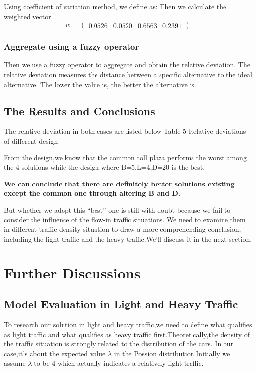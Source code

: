 Using coefficient of variation method, we define as:
Then we calculate the weighted vector
\begin{equation*}
w = 
\begin{pmatrix}
0.0526 & 0.0520 & 0.6563 &0.2391
\end{pmatrix}
\end{equation*}

\subsubsection{Aggregate using a fuzzy operator}
Then we use a fuzzy operator to aggregate and obtain the relative deviation.
The relative deviation measures the distance between a specific alternative to
the ideal alternative. The lower the value is, the better the alternative is.

\subsection{The Results and Conclusions}
The relative deviation in both cases are listed below
Table 5 Relative deviations of different design 

   From the design,we know that the common toll plaza performs the worst among the 4 solutions while the design where B=5,L=4,D=20 is the best.

\textbf{We can conclude that there are definitely better solutions existing except the common one through altering B and D.}

   But whether we adopt this “best” one is still with doubt because we fail to consider the influence of the flow-in traffic situations. We need to examine them in different traffic density situation to draw a more comprehending conclusion, including the light traffic and the heavy traffic.We'll discuss it in the next section.



\section{Further Discussions}
\subsection{Model Evaluation in Light and Heavy Traffic}
To research our solution in light and heavy traffic,we need to define what qualifies as light traffic and what qualifies as heavy traffic first.Theoretically,the density of the traffic situation is strongly related to the distribution of the cars. In our case,it's about the expected value $\lambda$ in the Possion distribution.Initially we assume $\lambda$ to be 4 which actually indicates a relatively light traffic.

